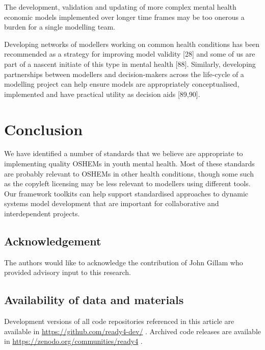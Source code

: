 \documentclass[
]{article}
\begin{document}
The development, validation and updating of more complex mental health economic models implemented over longer time frames may be too onerous a burden for a single modelling team.

Developing networks of modellers working on common health conditions has been recommended as a strategy for improving model validity {[}28{]} and some of us are part of a nascent initiate of this type in mental health {[}88{]}.
Similarly, developing partnerships between modellers and decision-makers across the life-cycle of a modelling project can help ensure models are appropriately conceptualised, implemented and have practical utility as decision aids {[}89,90{]}.

\hypertarget{conclusion}{%
\section{Conclusion}\label{conclusion}}

We have identified a number of standards that we believe are appropriate to implementing quality OSHEMs in youth mental health. Most of these standards are probably relevant to OSHEMs in other health conditions, though some such as the copyleft licensing may be less relevant to modellers using different tools. Our framework toolkits can help support standardised approaches to dynamic systems model development that are important for collaborative and interdependent projects.\\

\hypertarget{acknowledgement}{%
\subsection{Acknowledgement}\label{acknowledgement}}

The authors would like to acknowledge the contribution of John Gillam who provided advisory input to this research.

\hypertarget{availability-of-data-and-materials}{%
\subsection*{Availability of data and materials}\label{availability-of-data-and-materials}}

Development versions of all code repositories referenced in this article are available in \url{https://github.com/ready4-dev/} . Archived code releases are available in \url{https://zenodo.org/communities/ready4} .
\end{document}
